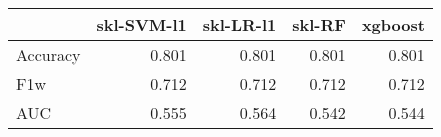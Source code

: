 \begin{tabular}{lrrrr}
\toprule
{} &  skl-SVM-l1 &  skl-LR-l1 &  skl-RF &  xgboost \\
\midrule
Accuracy &       0.801 &      0.801 &   0.801 &    0.801 \\
F1w      &       0.712 &      0.712 &   0.712 &    0.712 \\
AUC      &       0.555 &      0.564 &   0.542 &    0.544 \\
\bottomrule
\end{tabular}
